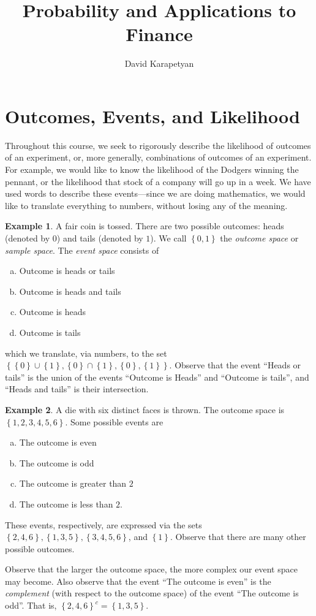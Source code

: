 \documentclass[12pt]{article}
\theoremstyle{plain}
\theoremstyle{definition}
\newtheorem*{example}{Example}
\theoremstyle{remark}
\numberwithin{equation}{section}  %
\begin{document}
\title{Probability and Applications to Finance}
\author{David Karapetyan}
\date{}
\maketitle
\newpage
\setcounter{tocdepth}{2}
\setcounter{secnumdepth}{2}
\tableofcontents
\newpage
\section{Outcomes, Events, and Likelihood}
Throughout this course, we seek to rigorously describe the likelihood of
outcomes of an experiment, or, more generally, combinations of outcomes of an 
experiment.
For example, we would like to know the likelihood of the Dodgers
winning the pennant, or the likelihood that stock of a company will go up
in a week. We have used words to describe these events---since we are doing
mathematics, we would like to translate everything to numbers, without losing
any of the meaning.
\begin{example}
	A fair coin is tossed. There are two possible outcomes: heads (denoted by 
	$0$) 
	and tails (denoted by $1$). We call $ \left\{ 0,1 \right\} $ the 
	\emph{outcome
	space} or \emph{sample space}. The \emph{event space} consists of
	\begin{enumerate}[(a)]
		\item Outcome is heads or tails
		\item Outcome is heads and tails
		\item Outcome is heads
		\item Outcome is tails
	\end{enumerate}
	which we translate, via numbers, to the set $ \left\{ \left\{ 0 \right\} 
	\cup
	\left\{ 1 \right\}, \left\{ 0 \right\} \cap \left\{ 1 \right\} , \left\{ 0
	\right\} , \left\{ 1 \right\} \right \}$.
	Observe that the event ``Heads or tails'' is the union of the events
	``Outcome is Heads'' and ``Outcome is tails'', and ``Heads and tails'' is
	their intersection.
\end{example}	

\begin{example}
	A die with six distinct faces is thrown. The outcome space is
	$ \left\{ 1, 2, 3, 4, 5, 6 \right\} $. Some possible events are
	\begin{enumerate}[(a)]
		\item The outcome is even
		\item The outcome is odd
		\item The outcome is greater than $2$
		\item The outcome is less than $2$.
	\end{enumerate}
	These events, respectively, are expressed via the sets
	$ \left\{ 2, 4, 6 \right\} , \left\{ 1,3,5 \right\} , \left\{ 3, 4, 5, 6
	\right\}$, and $\left\{ 1 \right\}$.
	Observe that there are many other possible outcomes.
\end{example}
Observe that the larger the outcome space, the more complex
our event space may become. Also observe that the event
``The outcome is even'' is the \emph{complement} (with respect to the
outcome space) of
the event ``The outcome is odd''. That is,
${\left\{ 2,4,6 \right\}}^c
= \left\{ 1,3,5 \right\}$.
\end{document}
